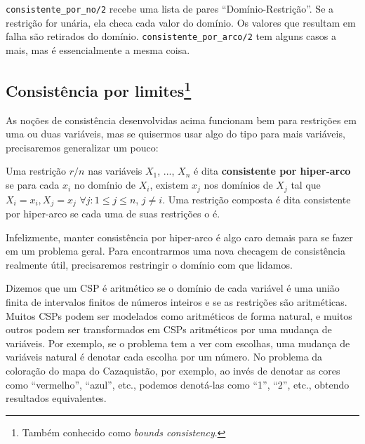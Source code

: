 \documentclass{article}
\begin{document}
\label{lst:arc_consistency} %

{\tt consistente\_por\_no/2} recebe uma lista de pares ``Domínio-Restrição''. Se a restrição for unária, ela checa cada valor do domínio.
Os valores que resultam em falha são retirados do domínio. {\tt consistente\_por\_arco/2} tem alguns casos a mais, mas é essencialmente a mesma coisa.

\subsection{Consistência por limites\footnote{Também conhecido como \textit{bounds consistency}.}}

As noções de consistência desenvolvidas acima funcionam bem para restrições em uma ou duas variáveis,
mas se quisermos usar algo do tipo para mais variáveis, precisaremos generalizar um pouco:

\begin{definition}
  Uma restrição $r/n$ nas variáveis $X_1$, ..., $X_n$ é dita \textbf{consistente por hiper-arco}
  se para cada $x_i$ no domínio de $X_i$, existem $x_j$ nos domínios de $X_j$ tal que
  $X_i = x_i, X_j = x_j$  $\forall j: 1 \leq j \leq n$, $j \neq i$. %
  Uma restrição composta é dita consistente por hiper-arco se cada uma de suas restrições o é.
\end{definition}

Infelizmente, manter consistência por hiper-arco é algo caro demais para se fazer em um problema geral. Para
encontrarmos uma nova checagem de consistência realmente útil, precisaremos restringir o domínio com que lidamos.

Dizemos que um CSP é aritmético se o domínio de cada variável é uma união
finita de intervalos finitos de números inteiros e se as restrições são aritméticas. Muitos CSPs podem ser modelados como aritméticos de forma natural, e muitos outros podem ser transformados em CSPs aritméticos por uma mudança de variáveis.
Por exemplo, se o problema tem a ver com escolhas, uma mudança de variáveis natural é denotar cada escolha por um número. No problema da
coloração do mapa do Cazaquistão, por exemplo, ao invés de denotar as cores como ``vermelho'', ``azul'', etc., podemos denotá-las como ``1'', ``2'', etc., obtendo resultados equivalentes.
\end{document}
